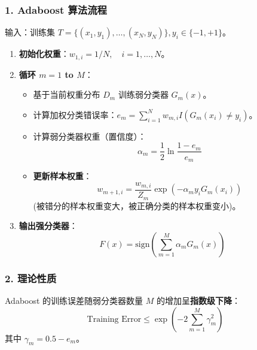 \documentclass[a4paper, 11pt]{ctexart}
\begin{document}
\subsubsection{1. Adaboost 算法流程}
输入：训练集 $T=\{(x_1, y_1), \dots, (x_N, y_N)\}, y_i \in \{-1, +1\}$。
\begin{enumerate}
    \item \textbf{初始化权重}：$w_{1,i} = 1/N, \quad i=1,\dots,N$。
    \item \textbf{循环 $m = 1$ to $M$}：
    \begin{itemize}
        \item 基于当前权重分布 $D_m$ 训练弱分类器 $G_m(x)$。
        \item 计算加权分类错误率：$e_m = \sum_{i=1}^N w_{m,i} I(G_m(x_i) \neq y_i)$。
        \item 计算弱分类器权重（置信度）：
        \begin{equation}
            \alpha_m = \frac{1}{2} \ln \frac{1-e_m}{e_m}
        \end{equation}
        \item \textbf{更新样本权重}：
        \begin{equation}
            w_{m+1, i} = \frac{w_{m,i}}{Z_m} \exp(-\alpha_m y_i G_m(x_i))
        \end{equation}
        (被错分的样本权重变大，被正确分类的样本权重变小)。
    \end{itemize}
    \item \textbf{输出强分类器}：
    \begin{equation}
        F(x) = \text{sign} \left( \sum_{m=1}^M \alpha_m G_m(x) \right)
    \end{equation}
\end{enumerate}

\subsubsection{2. 理论性质}
Adaboost 的训练误差随弱分类器数量 $M$ 的增加呈\textbf{指数级下降}：
$$ \text{Training Error} \le \exp(-2 \sum_{m=1}^M \gamma_m^2) $$
其中 $\gamma_m = 0.5 - e_m$。
\end{document}
